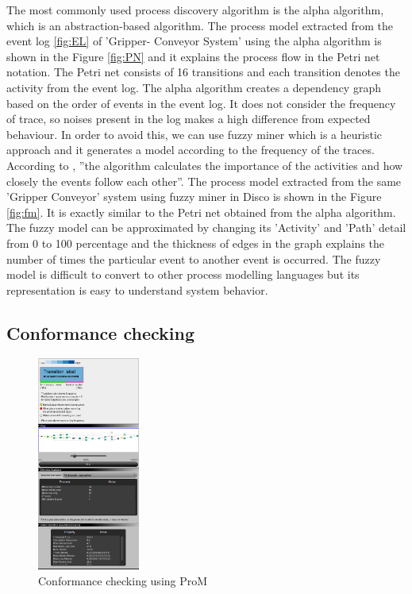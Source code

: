 \documentclass[conference]{IEEEtran}
\begin{document}
The most commonly used process discovery algorithm is the alpha algorithm, which is an abstraction-based algorithm. The process model extracted from the event log \ref{fig:EL} of ’Gripper- Conveyor System’ using the alpha algorithm is shown in the Figure \ref{fig:PN} and it explains the process flow in the Petri net notation. The Petri net consists of 16 transitions and each transition denotes the activity from the event log. The alpha algorithm creates a dependency graph based on the order of events in the event log. It does not consider the frequency of trace, so noises present in the log makes a high difference from expected behaviour. In order to avoid this, we can use fuzzy miner which is a heuristic approach and it generates a model according to the frequency of the traces. According to  \cite{paper4}, ”the algorithm calculates the importance of the activities and how closely the events follow each other”. The process model extracted from the same ’Gripper Conveyor’ system using fuzzy miner in Disco is shown in the Figure \ref{fig:fm}. It is exactly similar to the Petri net obtained from the alpha algorithm. The fuzzy model can be approximated by changing its ’Activity’ and ’Path’ detail from 0 to 100 percentage and the thickness of edges in the graph explains the number of times the particular event to another event is occurred. The fuzzy model is difficult to convert to other process modelling languages but its representation is easy to understand system behavior.

\subsection{Conformance checking}

\begin{figure}[!t]
	\centering
	\includegraphics[width=0.3\textwidth]{images/stat1.PNG}
	\caption{Conformance checking using ProM}
	\label{fig:stat}
\end{figure}
\end{document}
